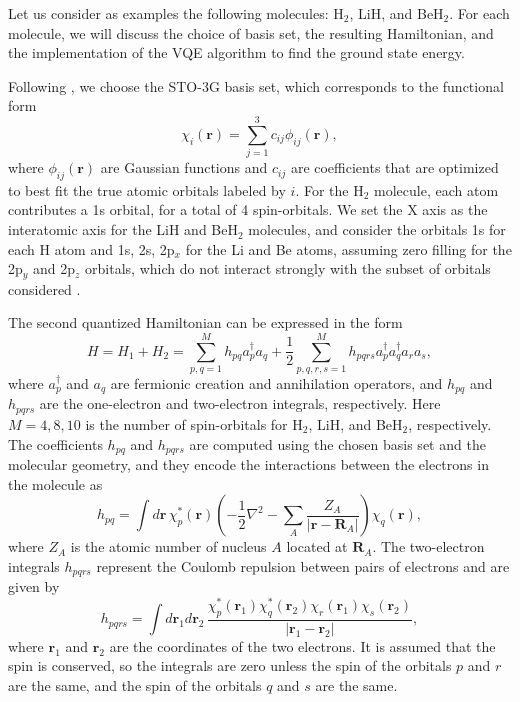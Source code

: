 \documentclass[12pt]{article}
\begin{document}
Let us consider as examples the following molecules: H$_2$, LiH, and BeH$_2$. For each molecule, we will discuss the choice of basis set, the resulting Hamiltonian, and the implementation of the VQE algorithm to find the ground state energy.

Following \cite{kandalaHardwareefficientVariationalQuantum2017}, we choose the STO-3G basis set, which corresponds to the functional form
\begin{equation}
    \chi_i(\mathbf{r}) = \sum_{j=1}^3 c_{ij} \phi_{ij}(\mathbf{r}),
\end{equation}
where $\phi_{ij}(\mathbf{r})$ are Gaussian functions and $c_{ij}$ are coefficients that are optimized to best fit the true atomic orbitals labeled by $i$. For the H$_2$ molecule, each atom contributes a 1s orbital, for a total of 4 spin-orbitals. We set the X axis as the interatomic axis for the LiH and BeH$_2$ molecules, and consider the orbitals 1s for each H atom and 1s, 2s, 2p$_x$ for the Li and Be atoms, assuming zero filling for the 2p$_y$ and 2p$_z$ orbitals, which do not interact strongly with the subset of orbitals considered \cite{kandalaHardwareefficientVariationalQuantum2017}. 

The second quantized Hamiltonian can be expressed in the form
\begin{equation}
    H = H_1 + H_2 = \sum_{p,q=1}^M h_{pq} a_p^\dagger a_q + \frac{1}{2} \sum_{p,q,r,s=1}^M h_{pqrs} a_p^\dagger a_q^\dagger a_r a_s,
\end{equation}
where $a_p^\dagger$ and $a_q$ are fermionic creation and annihilation operators, and $h_{pq}$ and $h_{pqrs}$ are the one-electron and two-electron integrals, respectively. Here $M=4, 8, 10$
is the number of spin-orbitals for H$_2$, LiH, and BeH$_2$, respectively. The coefficients $h_{pq}$ and $h_{pqrs}$ are computed using the chosen basis set and the molecular geometry, and they encode the interactions between the electrons in the molecule as
\begin{equation}
    h_{pq} = \int d\mathbf{r} \, \chi_p^*(\mathbf{r}) \left( -\frac{1}{2} \nabla^2 - \sum_A \frac{Z_A}{|\mathbf{r} - \mathbf{R}_A|} \right) \chi_q(\mathbf{r}),
\end{equation}
where $Z_A$ is the atomic number of nucleus $A$ located at $\mathbf{R}_A$. The two-electron integrals $h_{pqrs}$ represent the Coulomb repulsion between pairs of electrons and are given by
\begin{equation}
    h_{pqrs} = \int d\mathbf{r}_1 d\mathbf{r}_2 \, \frac{\chi_p^*(\mathbf{r}_1) \chi_q^*(\mathbf{r}_2) \chi_r(\mathbf{r}_1) \chi_s(\mathbf{r}_2)}{|\mathbf{r}_1 - \mathbf{r}_2|},
\end{equation} 
where $\mathbf{r}_1$ and $\mathbf{r}_2$ are the coordinates of the two electrons. It is assumed that the spin is conserved, so the integrals are zero unless the spin of the orbitals $p$ and $r$ are the same, and the spin of the orbitals $q$ and $s$ are the same.




\end{document}
